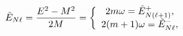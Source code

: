 \begin{equation}
\label{E+i}
\tilde{E}_{N\ell } = {E^{2}- M^{2}\over 2M} =
\left\{\begin{array}{c}2m\omega  = \tilde{E}^{+}_{N(\ell +1)},
\\
2(m+1)\omega  = \tilde{E}^{-}_{N\ell },
\end{array}\right.
\end{equation}

